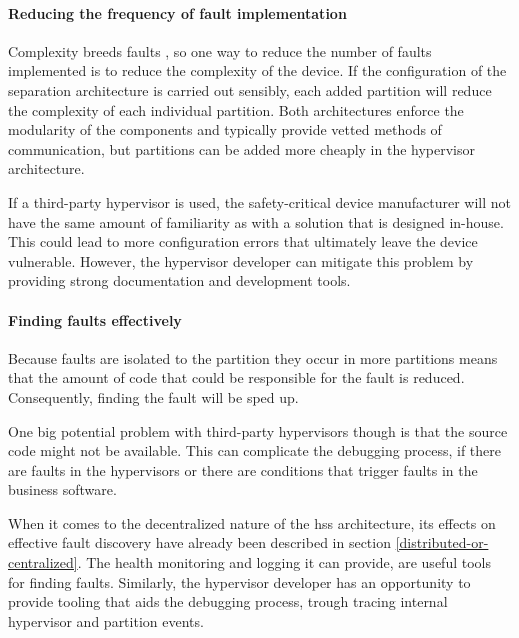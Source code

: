
\paragraph{Reducing the frequency of fault implementation}
Complexity breeds faults \cite{nguyen2017impact}, so one way to reduce the number of faults implemented is to reduce the complexity of the device. If the configuration of the separation architecture is carried out sensibly, each added partition will reduce the complexity of each individual partition. Both architectures enforce the modularity of the components and typically provide vetted methods of communication, but partitions can be added more cheaply in the hypervisor architecture.

If a third-party hypervisor is used, the safety-critical device manufacturer will not have the same amount of familiarity as with a solution that is designed in-house. This could lead to more configuration errors that ultimately leave the device vulnerable. However, the hypervisor developer can mitigate this problem by providing strong documentation and development tools.

\paragraph{Finding  faults effectively}
Because faults are isolated to the partition they occur in more partitions means that the amount of code that could be responsible for the fault is reduced. Consequently, finding the fault will be sped up.

One big potential problem with third-party hypervisors though is that the source code might not be available. This can complicate the debugging process, if there are faults in the hypervisors or there are conditions that trigger faults in the business software. 

When it comes to the decentralized nature of the \acrshort{hss} architecture, its effects on effective fault discovery have already been described in section \ref{distributed-or-centralized}. The health monitoring and logging it can provide, are useful tools for finding faults. Similarly, the hypervisor developer has an opportunity to provide tooling that aids the debugging process, trough tracing internal hypervisor and partition events.

